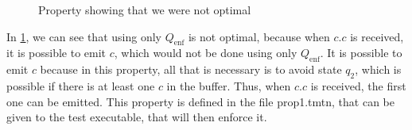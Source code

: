 \documentclass{article}
\begin{document}
\begin{figure}
\centering
{}
\caption{Property showing that we were not optimal}
\label{fig:propOptimality}
\end{figure}

In \cref{fig:propOptimality}, we can see that using only $Q_{\mathrm{enf}}$ is 
not optimal, because when $c . c$ is received, it is possible to emit $c$, which 
would not be done using only $Q_{\mathrm{enf}}$. It is possible to emit $c$ 
because in this property, all that is necessary is to avoid state $q_2$, which 
is possible if there is at least one $c$ in the buffer. Thus, when $c . c$ is 
received, the first one can be emitted. This property is defined in the file 
\textsf{prop1.tmtn}, that can be given to the \textsf{test} executable, that 
will then enforce it.
\end{document}
